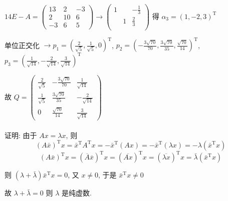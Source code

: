          \( 14E-A = \begin{pmatrix}
             13 & 2  & -3 \\
             2  & 10 & 6  \\
             -3 & 6  & 5
         \end{pmatrix} \rightarrow \begin{pmatrix}
             1 &   & -\frac{1}{3} \\
               & 1 & \frac{2}{3}  \\
               &   &
         \end{pmatrix} \) 得 \( \alpha_{3} = (1, -2, 3)^{\mathrm{T}} \)

         单位正交化 \( \rightarrow p_{1} = \left( \frac{2}{\sqrt{5}}, \frac{1}{\sqrt{5}}, 0 \right)^{\mathrm{T}} \), \( p_{2} = \left( -\frac{3\sqrt{70}}{70}, \frac{3\sqrt{70}}{35}, \frac{\sqrt{70}}{14} \right)^{\mathrm{T}} \), \( p_{3} = \left( \frac{1}{\sqrt{14}}, -\frac{2}{\sqrt{14}}, \frac{3}{\sqrt{14}} \right)^{\mathrm{T}} \)

         故 \( Q = \begin{pmatrix}
             \frac{2}{\sqrt{5}} & -\frac{3\sqrt{70}}{70} & \frac{1}{\sqrt{14}}  \\
             \frac{1}{\sqrt{5}} & \frac{3\sqrt{70}}{35}  & -\frac{2}{\sqrt{14}} \\
             0                  & \frac{\sqrt{70}}{14}   & \frac{3}{\sqrt{14}}
         \end{pmatrix} \)


     \paragraph{} %
         证明: 由于 \( Ax = \lambda x \), 则
         \[ (A\bar{x})^{\mathrm{T}}x = \bar{x}^{\mathrm{T}}A^{\mathrm{T}}x = -\bar{x}^{\mathrm{T}}(Ax) = -\bar{x}^{\mathrm{T}}(\lambda x) = -\lambda(\bar{x}^{\mathrm{T}}x) \]
         \[ (A\bar{x})^{\mathrm{T}}x = (\overline{A}\overline{x})^{\mathrm{T}}x = (\overline{Ax})^{\mathrm{T}}x = (\overline{\lambda x})^{\mathrm{T}}x = \bar{\lambda}(\bar{x}^{\mathrm{T}}x) \]

         则 \( (\lambda+\bar{\lambda})\bar{x}^{\mathrm{T}}x = 0 \), 又 \( x \neq 0 \), 于是 \( \bar{x}^{\mathrm{T}}x \neq 0 \)

         故 \( \lambda + \bar{\lambda} = 0 \) 则 \( \lambda \) 是纯虚数.
